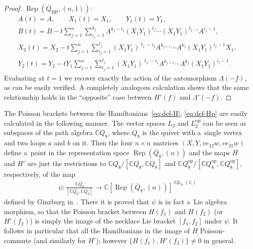 \documentclass[pdftex]{sigma}
\newcommand{\bb}[1]{\mathbb{#1}}
\newcommand{\app}[3]{#1\colon #2\to #3}
\newcommand{\ol}[1]{\overline{#1}}
\DeclareMathOperator{\GL}{GL}
\DeclareMathOperator{\Rep}{Rep}
\begin{document}
\begin{proof}
\(\Rep(\ol{Q}_{\mathrm{BP}},(n,1))\):
\begin{gather*}
A(t)=A,
\qquad
X_{1}(t)=X_{1},
\qquad
Y_{1}(t)=Y_{1},
\\
B(t)=B-t\sum_{j=1}^{n}\sum_{i_{j}=1}^{k_{j}}A^{k_{j}-i_{j}}(X_{1}Y_{1})^{\ell_{j}}\cdots(X_{1}Y_{1}
)^{\ell_{j-1}}A^{i_{j}-1},
\\
X_{2}(t)=X_{2}-t\sum_{j=1}^{n}\sum_{i_{j}=1}^{\ell_{j}}(X_{1}Y_{1})^{\ell_{j}-i_{j}}A^{k_{j+1}}
\cdots A^{k_{j}}(X_{1}Y_{1})^{i_{j}-1}X_{1},
\\
Y_{2}(t)=Y_{2}-t Y_{1}\sum_{j=1}^{n}\sum_{i_{j}=1}^{\ell_{j}}(X_{1}Y_{1})^{\ell_{j}-i_{j}}A^{k_{j+1}}
\cdots A^{k_{j}}(X_{1}Y_{1})^{i_{j}-1}.
\end{gather*}
Evaluating at \(t=1\) we recover exactly the action of the automorphism \(\Lambda(-f)\), as can be easily
verif\/ied.
A completely analogous calculation shows that the same relationship holds in the ``opposite'' case between
\(H'(f)\) and \(\Lambda'(-f)\).
\end{proof}

\begin{remark}
The Poisson brackets between the Hamiltonians~\eqref{eq:def-H}, \eqref{eq:def-Hp} are easily calculated in
the following manner.
The vector spaces \(L_{2}\) and \(L_{2}^{\mathrm{op}}\) can be seen as subspaces of the path algebra
\(\bb{C}\ol{Q}_{8}\), where \(Q_{8}\) is the quiver with a~single vertex and two loops \(a\) and \(b\) on
it.
Then the four \(n\times n\) matrices \((X, Y, ve_{12}w, ve_{21}w)\) def\/ine a~point in the representation
space \(\Rep(\ol{Q}_{8},(n))\) and the maps \(H\) and \(H'\) are just the restrictions to
\(\bb{C}Q_{8}/[\bb{C}Q_{8}, \bb{C}Q_{8}]\) and \(\bb{C}Q_{8}^{\mathrm{op}}/[\bb{C}Q_{8}^{\mathrm{op}},
\bb{C}Q_{8}^{\mathrm{op}}]\), respectively, of the map
\begin{gather*}
\app{\psi}{\frac{\bb{C}\ol{Q}_{8}}{[\bb{C}\ol{Q}_{8},\bb{C}\ol{Q}_{8}]}}{\bb{C}[\Rep(\ol{Q}_{8}
,(n))]^{\GL_{n}(\bb{C})}}
\end{gather*}
def\/ined by Ginzburg in~\cite{ginz01}.
There it is proved that \(\psi\) is in fact a~Lie algebra morphism, so that the Poisson bracket between
\(H(f_{1})\) and \(H(f_{2})\) (or \(H'(f_{2})\)) is simply the image of the necklace Lie bracket
\([f_{1},f_{2}]\) under \(\psi\).
It follows in particular that all the Hamiltonians in the image of \(H\) Poisson-commute (and similarly for
\(H'\)); however \(\{H(f_{1}),H'(f_{2})\}\neq 0\) in general.
\end{remark}
\end{document}
